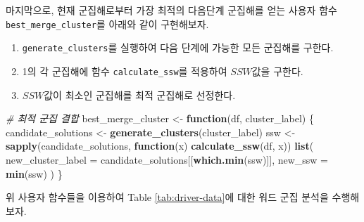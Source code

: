 \documentclass[]{book}
\newenvironment{Shaded}{\begin{snugshade}}{\end{snugshade}}
\newcommand{\CommentTok}[1]{\textcolor[rgb]{0.56,0.35,0.01}{\textit{#1}}}
\newcommand{\ControlFlowTok}[1]{\textcolor[rgb]{0.13,0.29,0.53}{\textbf{#1}}}
\newcommand{\DataTypeTok}[1]{\textcolor[rgb]{0.13,0.29,0.53}{#1}}
\newcommand{\DecValTok}[1]{\textcolor[rgb]{0.00,0.00,0.81}{#1}}
\newcommand{\KeywordTok}[1]{\textcolor[rgb]{0.13,0.29,0.53}{\textbf{#1}}}
\newcommand{\NormalTok}[1]{#1}
\newcommand{\OperatorTok}[1]{\textcolor[rgb]{0.81,0.36,0.00}{\textbf{#1}}}
\newcommand{\StringTok}[1]{\textcolor[rgb]{0.31,0.60,0.02}{#1}}
\providecommand{\tightlist}{%
  \setlength{\itemsep}{0pt}\setlength{\parskip}{0pt}}
\begin{document}
\begin{Shaded}
\end{Shaded}

마지막으로, 현재 군집해로부터 가장 최적의 다음단계 군집해를 얻는 사용자 함수 \texttt{best\_merge\_cluster}를 아래와 같이 구현해보자.

\begin{enumerate}
\def\labelenumi{\arabic{enumi}.}
\tightlist
\item
  \texttt{generate\_clusters}를 실행하여 다음 단계에 가능한 모든 군집해를 구한다.
\item
  1의 각 군집해에 함수 \texttt{calculate\_ssw}를 적용하여 \(SSW\)값을 구한다.
\item
  \(SSW\)값이 최소인 군집해를 최적 군집해로 선정한다.
\end{enumerate}

\begin{Shaded}
\begin{Highlighting}[]
\CommentTok{# 최적 군집 결합}
\NormalTok{best_merge_cluster <-}\StringTok{ }\ControlFlowTok{function}\NormalTok{(df, cluster_label) \{}
\NormalTok{  candidate_solutions <-}\StringTok{ }\KeywordTok{generate_clusters}\NormalTok{(cluster_label)}
\NormalTok{  ssw <-}\StringTok{ }\KeywordTok{sapply}\NormalTok{(candidate_solutions, }\ControlFlowTok{function}\NormalTok{(x) }\KeywordTok{calculate_ssw}\NormalTok{(df, x))}
  \KeywordTok{list}\NormalTok{(}
    \DataTypeTok{new_cluster_label =}\NormalTok{ candidate_solutions[[}\KeywordTok{which.min}\NormalTok{(ssw)]],}
    \DataTypeTok{new_ssw =} \KeywordTok{min}\NormalTok{(ssw)}
\NormalTok{  )}
\NormalTok{\}}
\end{Highlighting}
\end{Shaded}

위 사용자 함수들을 이용하여 Table \ref{tab:driver-data}에 대한 워드 군집 분석을 수행해보자.
\end{document}
